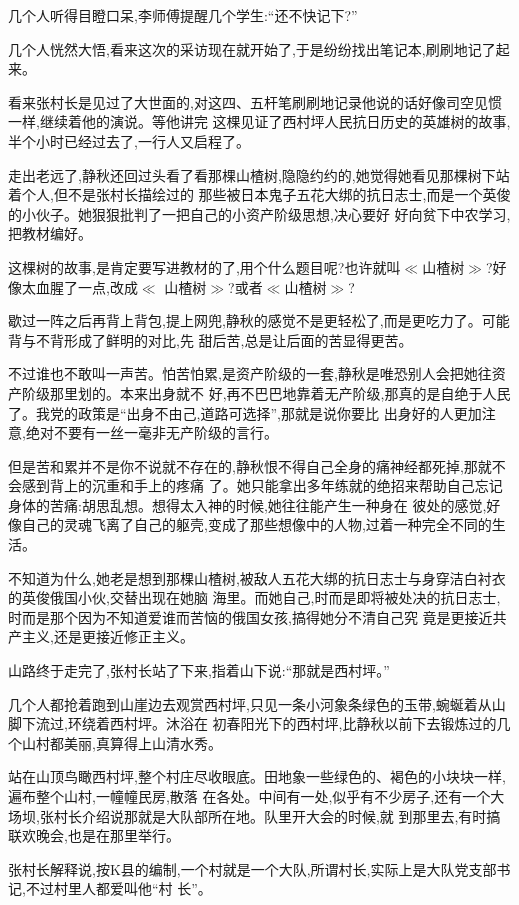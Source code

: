 ﻿\documentclass[12pt]{article}
\begin{document}
几个人听得目瞪口呆,李师傅提醒几个学生:``还不快记下?''

几个人恍然大悟,看来这次的采访现在就开始了,于是纷纷找出笔记本,刷刷地记了起来。

看来张村长是见过了大世面的,对这四、五杆笔刷刷地记录他说的话好像司空见惯一样,继续着他的演说。等他讲完
这棵见证了西村坪人民抗日历史的英雄树的故事,半个小时已经过去了,一行人又启程了。

走出老远了,静秋还回过头看了看那棵山楂树,隐隐约约的,她觉得她看见那棵树下站着个人,但不是张村长描绘过的
那些被日本鬼子五花大绑的抗日志士,而是一个英俊的小伙子。她狠狠批判了一把自己的小资产阶级思想,决心要好
好向贫下中农学习,把教材编好。

这棵树的故事,是肯定要写进教材的了,用个什么题目呢?也许就叫$\ll$山楂树$\gg$?好像太血腥了一点,改成$\ll$
山楂树$\gg$?或者$\ll$山楂树$\gg$?

歇过一阵之后再背上背包,提上网兜,静秋的感觉不是更轻松了,而是更吃力了。可能背与不背形成了鲜明的对比,先
甜后苦,总是让后面的苦显得更苦。

不过谁也不敢叫一声苦。怕苦怕累,是资产阶级的一套,静秋是唯恐别人会把她往资产阶级那里划的。本来出身就不
好,再不巴巴地靠着无产阶级,那真的是自绝于人民了。我党的政策是``出身不由己,道路可选择'',那就是说你要比
出身好的人更加注意,绝对不要有一丝一毫非无产阶级的言行。

但是苦和累并不是你不说就不存在的,静秋恨不得自己全身的痛神经都死掉,那就不会感到背上的沉重和手上的疼痛
了。她只能拿出多年练就的绝招来帮助自己忘记身体的苦痛:胡思乱想。想得太入神的时候,她往往能产生一种身在
彼处的感觉,好像自己的灵魂飞离了自己的躯壳,变成了那些想像中的人物,过着一种完全不同的生活。

不知道为什么,她老是想到那棵山楂树,被敌人五花大绑的抗日志士与身穿洁白衬衣的英俊俄国小伙,交替出现在她脑
海里。而她自己,时而是即将被处决的抗日志士,时而是那个因为不知道爱谁而苦恼的俄国女孩,搞得她分不清自己究
竟是更接近共产主义,还是更接近修正主义。

 
山路终于走完了,张村长站了下来,指着山下说:``那就是西村坪。''

几个人都抢着跑到山崖边去观赏西村坪,只见一条小河象条绿色的玉带,蜿蜒着从山脚下流过,环绕着西村坪。沐浴在
初春阳光下的西村坪,比静秋以前下去锻炼过的几个山村都美丽,真算得上山清水秀。

站在山顶鸟瞰西村坪,整个村庄尽收眼底。田地象一些绿色的、褐色的小块块一样,遍布整个山村,一幢幢民房,散落
在各处。中间有一处,似乎有不少房子,还有一个大场坝,张村长介绍说那就是大队部所在地。队里开大会的时候,就
到那里去,有时搞联欢晚会,也是在那里举行。

张村长解释说,按K县的编制,一个村就是一个大队,所谓村长,实际上是大队党支部书记,不过村里人都爱叫他``村
长''。
\end{document}
